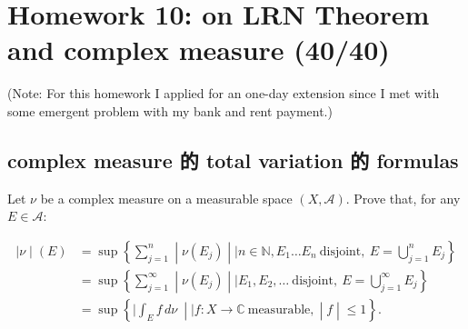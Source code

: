 \documentclass{qlnotes-export}
\begin{document}
\chapter{Homework 10: on LRN Theorem and complex measure (40/40)}\label{homework-10-on-lrn-theorem-and-complex-measure-4040}

(Note: For this homework I applied for an one-day extension since I met with some emergent problem with my bank and rent payment.)

\section{complex measure 的 total variation 的 formulas}\label{complex-measure-ux7684-total-variation-ux7684-formulas}

Let \(\nu\) be a complex measure on a measurable space \((X,\mathcal{A})\). Prove that, for any \(E \in \mathcal{A}\):

\[\begin{matrix}
\left. |\nu \middle| (E) \right. & {= \sup\left\{ \sum\limits_{j = 1}^{n} \middle| \nu(E_{j}) \middle| \mid n \in {\mathbb{N}},E_{1}\ldots E_{n}\ \text{disjoint},\ E = \bigcup\limits_{j = 1}^{n}E_{j} \right\}} \\
 & {= \sup\left\{ \sum\limits_{j = 1}^{\infty} \middle| \nu(E_{j}) \middle| \mid E_{1},E_{2},\ldots\ \text{disjoint},\ E = \bigcup\limits_{j = 1}^{\infty}E_{j} \right\}} \\
 & {= \sup\left\{ |\int_{E}f\, d\nu\  \middle| \mid f:X\rightarrow{\mathbb{C}}\ \text{measurable}, \middle| f \middle| \leq 1 \right\}.}
\end{matrix}\]
\end{document}
